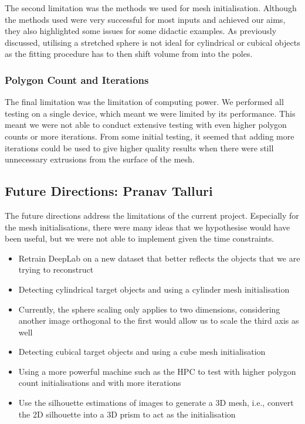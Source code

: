\documentclass{article}
\begin{document}
The second limitation was the methods we used for mesh initialisation. Although the methods used were very successful for most inputs and achieved our aims, they also highlighted some issues for some didactic examples. As previously discussed, utilising a stretched sphere is not ideal for cylindrical or cubical objects as the fitting procedure has to then shift volume from into the poles.

\subsubsection{Polygon Count and Iterations}

The final limitation was the limitation of computing power. We performed all testing on a single device, which meant we were limited by its performance. This meant we were not able to conduct extensive testing with even higher polygon counts or more iterations. From some initial testing, it seemed that adding more iterations could be used to give higher quality results when there were still unnecessary extrusions from the surface of the mesh.

\subsection{Future Directions: Pranav Talluri}

The future directions address the limitations of the current project. Especially for the mesh initialisations, there were many ideas that we hypothesise would have been useful, but we were not able to implement given the time constraints.
\begin{itemize}
  \item Retrain DeepLab on a new dataset that better reflects the objects that we are trying to reconstruct
  \item Detecting cylindrical target objects and using a cylinder mesh initialisation
  \item Currently, the sphere scaling only applies to two dimensions, considering another image orthogonal to the first would allow us to scale the third axis as well
  \item Detecting cubical target objects and using a cube mesh initialisation
  \item Using a more powerful machine such as the HPC to test with higher polygon count initialisations and with more iterations
  \item Use the silhouette estimations of images to generate a 3D mesh, i.e., convert the 2D silhouette into a 3D prism to act as the initialisation
\end{itemize}
\end{document}
